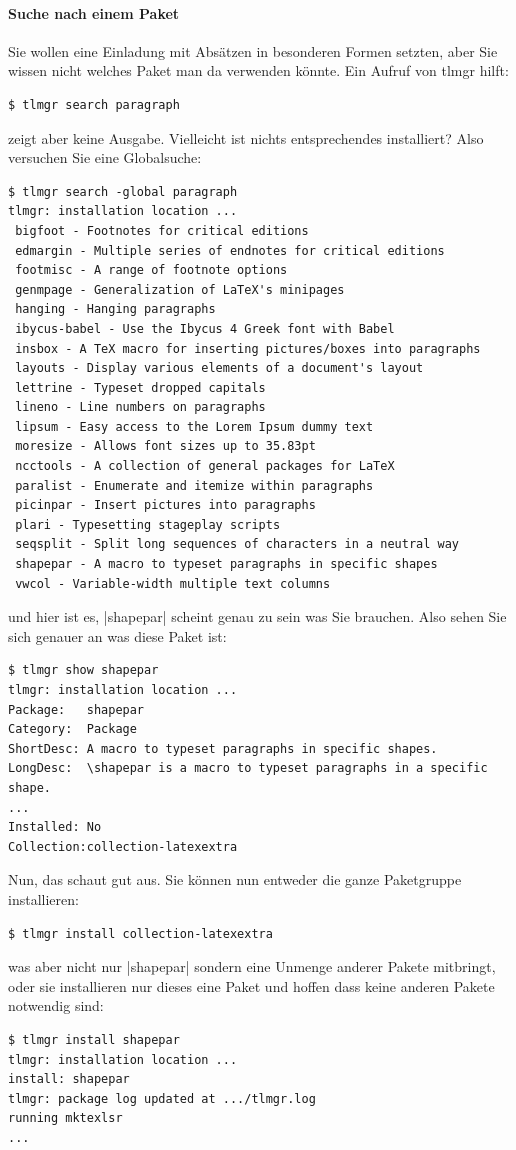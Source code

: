 \paragraph{Suche nach einem Paket}

Sie wollen eine Einladung mit Absätzen in besonderen Formen setzten, aber
Sie wissen nicht welches Paket man da verwenden könnte. Ein Aufruf von
tlmgr hilft:
\begin{lstlisting}
$ tlmgr search paragraph
\end{lstlisting}
zeigt aber keine Ausgabe. Vielleicht ist nichts entsprechendes installiert?
Also versuchen Sie eine Globalsuche:
\lstset{breaklines}
\begin{lstlisting}
$ tlmgr search -global paragraph
tlmgr: installation location ...
 bigfoot - Footnotes for critical editions
 edmargin - Multiple series of endnotes for critical editions
 footmisc - A range of footnote options
 genmpage - Generalization of LaTeX's minipages
 hanging - Hanging paragraphs
 ibycus-babel - Use the Ibycus 4 Greek font with Babel
 insbox - A TeX macro for inserting pictures/boxes into paragraphs
 layouts - Display various elements of a document's layout
 lettrine - Typeset dropped capitals
 lineno - Line numbers on paragraphs
 lipsum - Easy access to the Lorem Ipsum dummy text
 moresize - Allows font sizes up to 35.83pt
 ncctools - A collection of general packages for LaTeX
 paralist - Enumerate and itemize within paragraphs
 picinpar - Insert pictures into paragraphs
 plari - Typesetting stageplay scripts
 seqsplit - Split long sequences of characters in a neutral way
 shapepar - A macro to typeset paragraphs in specific shapes
 vwcol - Variable-width multiple text columns
\end{lstlisting}
und hier ist es, |shapepar| scheint genau zu sein was Sie brauchen. Also
sehen Sie sich genauer an was diese Paket ist:
\begin{lstlisting}
$ tlmgr show shapepar
tlmgr: installation location ...
Package:   shapepar
Category:  Package
ShortDesc: A macro to typeset paragraphs in specific shapes.
LongDesc:  \shapepar is a macro to typeset paragraphs in a specific shape.
...
Installed: No
Collection:collection-latexextra
\end{lstlisting}
Nun, das schaut gut aus. Sie können nun entweder die ganze Paketgruppe
installieren:
\begin{lstlisting}
$ tlmgr install collection-latexextra
\end{lstlisting}
was aber nicht nur |shapepar| sondern eine Unmenge anderer Pakete mitbringt,
oder sie installieren nur dieses eine Paket und hoffen dass keine
anderen Pakete notwendig sind:
\begin{lstlisting}
$ tlmgr install shapepar
tlmgr: installation location ...
install: shapepar
tlmgr: package log updated at .../tlmgr.log
running mktexlsr
...
\end{lstlisting}

